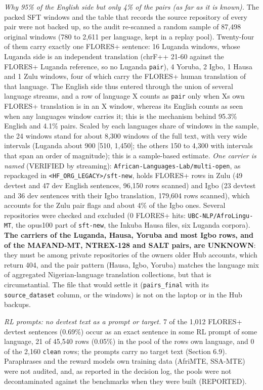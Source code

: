 \emph{Why 95\% of the English side but only 4\% of the pairs (as far as it is known).} The packed SFT windows and the table that records the source repository of every pair were not backed up, so the audit re-scanned a random sample of 87,498 original windows (780 to 2,611 per language, kept in a replay pool). Twenty-four of them carry exactly one FLORES+ sentence: 16 Luganda windows, whose Luganda side is an independent translation (chrF++ 21-60 against the FLORES+ Luganda reference, so no Luganda \texttt{pair}), 4 Yoruba, 2 Igbo, 1 Hausa and 1 Zulu windows, four of which carry the FLORES+ human translation of that language. The English side thus entered through the union of several language streams, and a row of language X counts as \texttt{pair} only when X\textquotesingle s own FLORES+ translation is in an X window, whereas its English counts as seen when any language\textquotesingle s window carries it; this is the mechanism behind 95.3\% English and 4.1\% pairs. Scaled by each language\textquotesingle s share of windows in the sample, the 24 windows stand for about 8,300 windows of the full text, with very wide intervals (Luganda about 900 {[}510, 1,450{]}; the others 150 to 4,300 with intervals that span an order of magnitude); this is a sample-based estimate. \emph{One carrier is named} (VERIFIED by streaming): \texttt{African-Languages-Lab/multi-open}, as repackaged in \texttt{<HF_ORG_LEGACY>/sft-new}, holds FLORES+ rows in Zulu (49 devtest and 47 dev English sentences, 96,150 rows scanned) and Igbo (23 devtest and 36 dev sentences with their Igbo translation, 179,604 rows scanned), which accounts for the Zulu pair flags and about 4\% of the Igbo ones. Several repositories were checked and excluded (0 FLORES+ hits: \texttt{UBC-NLP/AfroLingu-MT}, the opus100 part of \texttt{sft-new}, the Inkuba Hausa files, six Luganda corpora). \textbf{The carriers of the Luganda, Hausa, Yoruba and most Igbo rows, and of the MAFAND-MT, NTREX-128 and SALT pairs, are UNKNOWN}: they must be among private repositories of the owner\textquotesingle s older Hub accounts, which return 404, and the pair pattern (Hausa, Igbo, Yoruba) matches the language mix of aggregated Nigerian-language translation collections, but that is circumstantial. The file that would settle it (\texttt{pairs\_final} with its \texttt{source\_dataset} column, or the windows) is not on the laptop or in the Hub backups.

\emph{RL prompts: no devtest text as a prompt or target.} 7 of the 1,012 FLORES+ devtest sentences (0.69\%) occur as an exact sentence in some RL prompt of some language, 21 of 45,540 rows (0.05\%) in the pool of the row\textquotesingle s own language, and 0 of the 2,160 \texttt{clean} rows; the prompts carry no target text (Section 6.9). Paraphrases and the reward models\textquotesingle{} own training data (AfriMTE, SSA-MTE) were not audited, and, as reported in the decision log, the pools were not decontaminated against the benchmarks when they were built (REPORTED).

